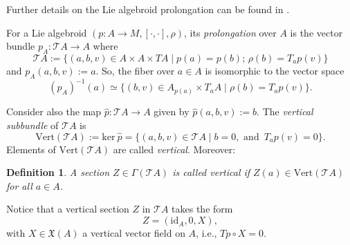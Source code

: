 \documentclass[12pt,letterpaper]{article}
\renewcommand{\hat}{\widehat}
\newtheorem{definition}[theorem]{Definition}
\numberwithin{equation}{section}
\begin{document}
Further details on the Lie algebroid prolongation can be found in \cite{carinena2007reduction,deLeonEtAl2005,martinez2002lie,Martinez2001}.

For a Lie algebroid $(p: A \rightarrow M, [ \cdot, \cdot ], \rho)$, its \emph{prolongation} over $A$  
is the vector bundle $p_A: \mathcal{T} A \rightarrow A   $ where
\begin{equation}
\mathcal{T} A :=\{ (a,b,v)\in A\times A \times TA \mid p(a)=p(b); \, \rho(b)=T_a p(v)   \}\label{prolalgebroid}
\end{equation}
and  $p_A(a,b,v):=a$.
So, the fiber over $a\in A$ is isomorphic to the vector space
\begin{equation*}
(p_A)^{-1}(a) \simeq \{ (b,v) \in A_{p(a)}\times T_a A \mid  \rho(b)= T_a p(v) \}.
\end{equation*}

Consider also the map $\hat{p}:\mathcal{T} A \rightarrow A$ given by $\hat{p}(a,b,v):=b$.
The \emph{vertical subbundle} of $\mathcal{T} A$ is
\begin{equation}\label{vert-subbundle}
\mathrm{Vert}(\mathcal{T} A ) := \mathrm{ker}\ \hat{p} = \{ (a,b,v )\in \mathcal{T} A \mid b=0, \text{ and } \, T_ap(v)=0 \}.
\end{equation}
Elements of $\mathrm{Vert}(\mathcal{T} A )$ are called \emph{vertical}. Moreover: %

\begin{definition} 
A section $Z\in \Gamma( \mathcal{T} A )$ is called \emph{vertical} if  $Z(a)\in \mathrm{Vert}(\mathcal{T} A ) $ for all $a\in A$.
\end{definition}
Notice that a vertical section $Z$ in   $\mathcal{T} A  $ takes the form
$$ Z = (\mathrm{id}_A, 0 , X),  $$
with $X\in \mathfrak{X}(A)$ a vertical vector field on $A$, i.e., $Tp \circ  X=0.$
\end{document}
